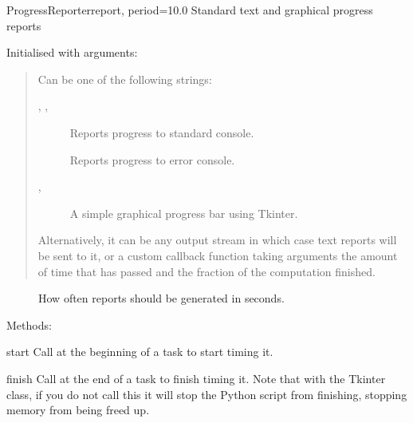 \documentclass[letterpaper,10pt,english]{manual}
\begin{document}
\hypertarget{brian.utils.progressreporting.ProgressReporter}{}\begin{classdesc}{ProgressReporter}{report, period=10.0}
Standard text and graphical progress reports

Initialised with arguments:

\begin{quote}

Can be one of the following strings:
\begin{description}
\item[, , ]
Reports progress to standard console.

\item[]
Reports progress to error console.

\item[, ]
A simple graphical progress bar using Tkinter.

\end{description}

Alternatively, it can be any output stream in which
case text reports will be sent to it, or a custom callback function
 taking arguments 
the amount of time that has passed and  the fraction of
the computation finished.
\end{quote}
\begin{description}
\item[]
How often reports should be generated in seconds.

\end{description}

Methods:

\hypertarget{brian.ProgressReporter.start}{}\begin{methoddesc}{start}{}
Call at the beginning of a task to start timing it.
\end{methoddesc}

\hypertarget{brian.ProgressReporter.finish}{}\begin{methoddesc}{finish}{}
Call at the end of a task to finish timing it. Note that
with the Tkinter class, if you do not call this it will
stop the Python script from finishing, stopping memory
from being freed up.
\end{methoddesc}


\end{classdesc}
\end{document}
